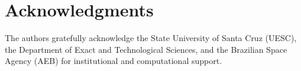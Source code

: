 \documentclass[preprint,12pt,3p]{elsarticle}
\begin{document}
\section*{Acknowledgments}
The authors gratefully acknowledge the State University of Santa Cruz (UESC), the Department of Exact and Technological Sciences, and the Brazilian Space Agency (AEB) for institutional and computational support.



\end{document}

